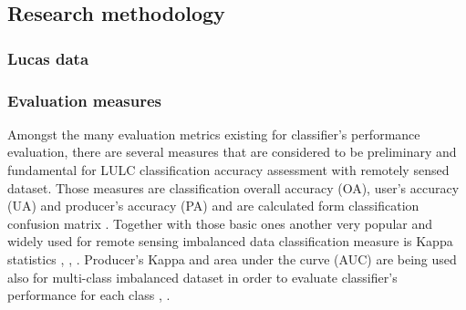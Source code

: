 \documentclass[parskip=full]{scrartcl}
\begin{document}
\subsection{Research methodology}

\subsubsection{Lucas data}


\subsubsection{Evaluation measures}
Amongst the many evaluation metrics existing for classifier's performance
evaluation, there are several measures that are considered to be preliminary and
fundamental for LULC classification accuracy assessment with remotely sensed
dataset. Those measures are classification overall accuracy (OA), user's
accuracy (UA) and producer's accuracy (PA) and are calculated form
classification confusion matrix \cite{Liu2007}. Together with those basic ones
another very popular and widely used for remote sensing imbalanced data
classification measure is Kappa statistics \cite{Du2015}, \cite{Wang2018},
\cite{Foody2002}. Producer's Kappa and area under the curve (AUC) are being used
also for multi-class imbalanced dataset in order to evaluate classifier's
performance for each class \cite{Freeman2012}, \cite{Mellor2015}.



\end{document}
